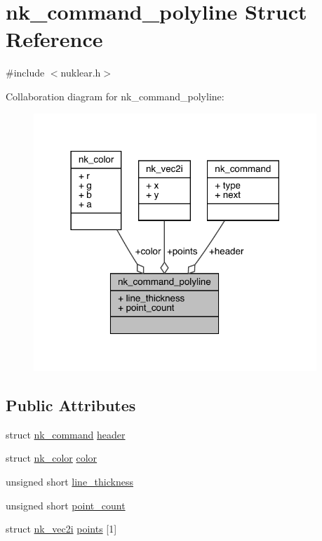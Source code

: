 \hypertarget{structnk__command__polyline}{}\section{nk\+\_\+command\+\_\+polyline Struct Reference}
\label{structnk__command__polyline}


{\ttfamily \#include $<$nuklear.\+h$>$}



Collaboration diagram for nk\+\_\+command\+\_\+polyline\+:
\nopagebreak
\begin{figure}[H]
\begin{center}
\leavevmode
\includegraphics[width=302pt]{structnk__command__polyline__coll__graph}
\end{center}
\end{figure}
\subsection*{Public Attributes}
\begin{DoxyCompactItemize}
\item 
struct \mbox{\hyperlink{structnk__command}{nk\+\_\+command}} \mbox{\hyperlink{structnk__command__polyline_ac4b2857834ce82c7780d20993f665c69}{header}}
\item 
struct \mbox{\hyperlink{structnk__color}{nk\+\_\+color}} \mbox{\hyperlink{structnk__command__polyline_a9ff77b8a3788b03ea52a7ef5b472f70c}{color}}
\item 
unsigned short \mbox{\hyperlink{structnk__command__polyline_a1413616519a1bfbacf3ea85455d6ccad}{line\+\_\+thickness}}
\item 
unsigned short \mbox{\hyperlink{structnk__command__polyline_accef2f25308202055403979b4b8a0deb}{point\+\_\+count}}
\item 
struct \mbox{\hyperlink{structnk__vec2i}{nk\+\_\+vec2i}} \mbox{\hyperlink{structnk__command__polyline_a7a12da93e13f22c6286c0e3f608170b5}{points}} \mbox{[}1\mbox{]}
\end{DoxyCompactItemize}



